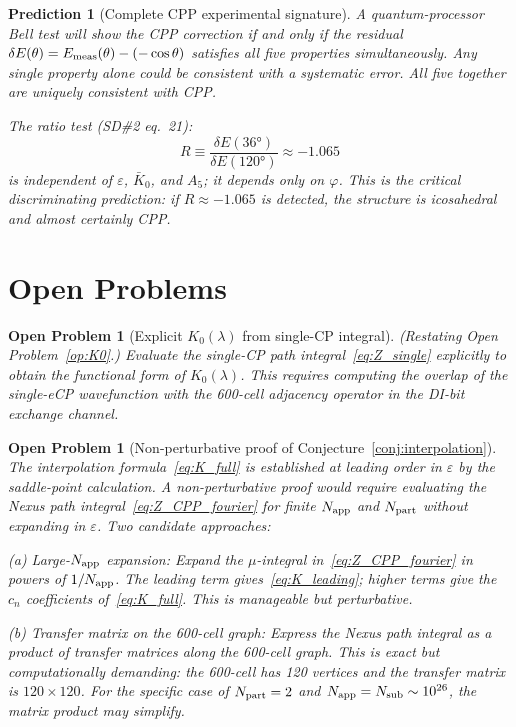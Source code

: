 \documentclass[11pt,letterpaper]{article}
\newtheorem{openprob}[theorem]{Open Problem}
\newtheorem{prediction}[theorem]{Prediction}
\newcommand{\phig}{\varphi}
\newcommand{\eps}{\varepsilon}
\newcommand{\Napp}{N_{\rm app}}
\newcommand{\Npart}{N_{\rm part}}
\newcommand{\Nsub}{N_{\rm sub}}
\begin{document}
\begin{prediction}[Complete CPP experimental signature]
\label{pred:complete}
A quantum-processor Bell test will show the CPP correction if and
only if the residual $\delta E(\theta) = E_{\rm meas}(\theta) -
(-\cos\theta)$ satisfies all five properties simultaneously.
Any single property alone could be consistent with a systematic
error.  All five together are uniquely consistent with CPP.

The ratio test (SD\#2 eq.~21):
\begin{equation}
R \equiv \frac{\delta E(36°)}{\delta E(120°)}
\approx -1.065
\label{eq:ratio_pred}
\end{equation}
is independent of $\eps$, $\bar K_0$, and $A_5$; it depends only
on $\phig$.  This is the critical discriminating prediction:
if $R \approx -1.065$ is detected, the structure is icosahedral
and almost certainly CPP.
\end{prediction}

\section{Open Problems}

\begin{openprob}[Explicit $K_0(\lambda)$ from single-CP integral]
(Restating Open Problem~\ref{op:K0}.)
Evaluate the single-CP path integral~\eqref{eq:Z_single}
explicitly to obtain the functional form of $K_0(\lambda)$.
This requires computing the overlap of the single-eCP wavefunction
with the 600-cell adjacency operator in the DI-bit exchange channel.
\end{openprob}

\begin{openprob}[Non-perturbative proof of Conjecture~\ref{conj:interpolation}]
\label{op:nonpert}
The interpolation formula~\eqref{eq:K_full} is established at
leading order in $\eps$ by the saddle-point calculation.  A
non-perturbative proof would require evaluating the Nexus path
integral~\eqref{eq:Z_CPP_fourier} for finite $\Napp$ and $\Npart$
without expanding in $\eps$.  Two candidate approaches:

\textit{(a) Large-$\Napp$ expansion:}  Expand the $\mu$-integral
in~\eqref{eq:Z_CPP_fourier} in powers of $1/\Napp$.  The leading
term gives~\eqref{eq:K_leading}; higher terms give the $c_n$
coefficients of~\eqref{eq:K_full}.  This is manageable but
perturbative.

\textit{(b) Transfer matrix on the 600-cell graph:}  Express the
Nexus path integral as a product of transfer matrices along the
600-cell graph.  This is exact but computationally demanding:
the 600-cell has 120 vertices and the transfer matrix is
$120\times120$.  For the specific case of $\Npart = 2$ and
$\Napp = \Nsub \sim 10^{26}$, the matrix product may simplify.
\end{openprob}
\end{document}

